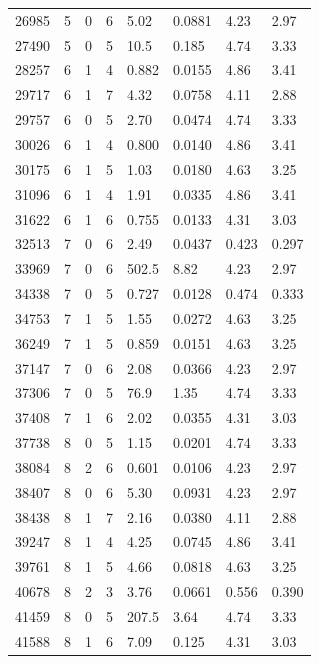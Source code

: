 \documentclass[preview]{standalone}
\begin{document}
{{{\begin{tabular}{L{1.2cm}C{1.2cm} C{0.3cm}C{0.5cm} C{1.4cm}C{1.4cm} C{1.4cm}C{1.4cm}}
  26985  &     5  & 0     &  6 &  5.02  & 0.0881  & 4.23 &  2.97   \\ 
  27490  &     5  & 0     &  5 &  10.5  & 0.185  & 4.74 &  3.33   \\ 
  28257  &     6  & 1     &  4 &  0.882  & 0.0155  & 4.86 &  3.41   \\ 
  29717  &     6  & 1     &  7 &  4.32  & 0.0758  & 4.11 &  2.88   \\ 
  29757  &     6  & 0     &  5 &  2.70  & 0.0474  & 4.74 &  3.33   \\ 
  30026  &     6  & 1     &  4 &  0.800  & 0.0140  & 4.86 &  3.41   \\ 
  30175  &     6  & 1     &  5 &  1.03  & 0.0180  & 4.63 &  3.25   \\ 
  31096  &     6  & 1     &  4 &  1.91  & 0.0335  & 4.86 &  3.41   \\ 
  31622  &     6  & 1     &  6 &  0.755  & 0.0133  & 4.31 &  3.03   \\ 
  32513  &     7  & 0     &  6 &  2.49  & 0.0437  & 0.423 &  0.297   \\ 
  33969  &     7  & 0     &  6 &  502.5  & 8.82  & 4.23 &  2.97   \\ 
  34338  &     7  & 0     &  5 &  0.727  & 0.0128  & 0.474 &  0.333   \\ 
  34753  &     7  & 1     &  5 &  1.55  & 0.0272  & 4.63 &  3.25   \\ 
  36249  &     7  & 1     &  5 &  0.859  & 0.0151  & 4.63 &  3.25   \\ 
  37147  &     7  & 0     &  6 &  2.08  & 0.0366  & 4.23 &  2.97   \\ 
  37306  &     7  & 0     &  5 &  76.9  & 1.35  & 4.74 &  3.33   \\ 
  37408  &     7  & 1     &  6 &  2.02  & 0.0355  & 4.31 &  3.03   \\ 
  37738  &     8  & 0     &  5 &  1.15  & 0.0201  & 4.74 &  3.33   \\ 
  38084  &     8  & 2     &  6 &  0.601  & 0.0106  & 4.23 &  2.97   \\ 
  38407  &     8  & 0     &  6 &  5.30  & 0.0931  & 4.23 &  2.97   \\ 
  38438  &     8  & 1     &  7 &  2.16  & 0.0380  & 4.11 &  2.88   \\ 
  39247  &     8  & 1     &  4 &  4.25  & 0.0745  & 4.86 &  3.41   \\ 
  39761  &     8  & 1     &  5 &  4.66  & 0.0818  & 4.63 &  3.25   \\ 
  40678  &     8  & 2     &  3 &  3.76  & 0.0661  & 0.556 &  0.390   \\ 
  41459  &     8  & 0     &  5 &  207.5  & 3.64  & 4.74 &  3.33   \\ 
  41588  &     8  & 1     &  6 &  7.09  & 0.125  & 4.31 &  3.03   \\ 
\hline 
\end{tabular} 

}}}
\end{document}
